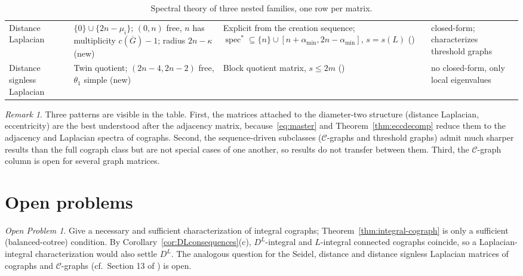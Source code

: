 \documentclass[11pt]{article}
\theoremstyle{plain}
\theoremstyle{definition}
\theoremstyle{remark}
\newtheorem{remark}[theorem]{Remark}
\newtheorem{openproblem}[theorem]{Open Problem}
\DeclareMathOperator{\spec}{spec}
\begin{document}
\begin{table}[h]
\begin{tabular}{@{}p{}p{}p{}p{}@{}}
			Distance Laplacian & $\{0\}\cup\{2n-\mu_i\}$; $(0,n)$ free, $n$ has multiplicity $c(\overline G)-1$; radius $2n-\kappa$ (new) & Explicit from the creation sequence; $\spec^*\subseteq\{n\}\cup[n+\alpha_{\min},2n-\alpha_{\min}]$, $s=s(L)$ (\cite{MandalManna2026DLDQ}) &closed-form; characterizes threshold graphs\cite{LatherGuptaBalaji2025,MeghaParvathy2026} \\
			Distance signless Laplacian & Twin quotient; $(2n-4,2n-2)$ free, $\theta_1$ simple (new) & Block quotient matrix, $s\le2m$ (\cite{MandalManna2026DLDQ}) & no closed-form, only local eigenvalues \cite{MannaMandal2026} \\
			\bottomrule
		\end{tabular}
		\caption{Spectral theory of three nested families, one row per matrix.}
		\label{tab:comparison}
	\end{table}
	
	\begin{remark}
		Three patterns are visible in the table. First, the matrices attached to the diameter-two structure (distance Laplacian, eccentricity) are the best understood after the adjacency matrix, because~\eqref{eq:master} and Theorem~\ref{thm:eccdecomp} reduce them to the adjacency and Laplacian spectra of cographs. Second, the sequence-driven subclasses ($\mathcal{C}$-graphs and threshold graphs) admit much sharper results than the full cograph class but are not special cases of one another, so results do not transfer between them. Third, the $\mathcal{C}$-graph column is open for several graph matrices.
	\end{remark}
	
	\section{Open problems}
	\label{sec:open}
	
	\begin{openproblem}
		\label{op:integral}
		Give a necessary and sufficient characterization of integral cographs; Theorem~\ref{thm:integral-cograph} is only a sufficient (balanced-cotree) condition. By Corollary~\ref{cor:DLconsequences}(c), $D^L$-integral and $L$-integral connected cographs coincide, so a Laplacian-integral characterization would also settle $D^L$. The analogous question for the Seidel, distance and distance signless Laplacian matrices of cographs and $\mathcal{C}$-graphs (cf.\ Section 13 of \cite{MannaMandal2026}) is open.
	\end{openproblem}
	
\end{document}
